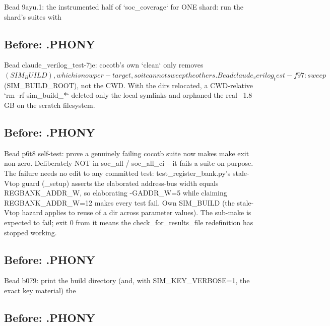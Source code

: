 \begin{record}
\begin{textblock}
Bead 9ayu.1: the instrumented half of `soc_coverage` for ONE shard: run the shard's suites with
\end{textblock}

\subsection*{Before: .PHONY}

\begin{textblock}
Bead claude_verilog_test-7je: cocotb's own `clean` only removes $(SIM_BUILD),
which is now per-target, so it cannot sweep the others.
Bead claude_verilog_test-f97: sweep $(SIM_BUILD_ROOT), not the CWD.  With the
dirs relocated, a CWD-relative `rm -rf sim_build_*` deleted only the local
symlinks and orphaned the real ~1.8 GB on the scratch filesystem.
\end{textblock}

\subsection*{Before: .PHONY}

\begin{textblock}
Bead p6t8 self-test: prove a genuinely failing cocotb suite now makes make exit non-zero.
Deliberately NOT in soc_all / soc_all_ci -- it fails a suite on purpose.  The failure needs
no edit to any committed test: test_register_bank.py's stale-Vtop guard (_setup) asserts
the elaborated address-bus width equals REGBANK_ADDR_W, so elaborating -GADDR_W=5 while
claiming REGBANK_ADDR_W=12 makes every test fail.  Own SIM_BUILD (the stale-Vtop hazard
applies to reuse of a dir across parameter values).  The sub-make is expected to fail;
exit 0 from it means the check_for_results_file redefinition has stopped working.
\end{textblock}

\subsection*{Before: .PHONY}

\begin{textblock}
Bead b079: print the build directory (and, with SIM_KEY_VERBOSE=1, the exact key material) the
\end{textblock}

\subsection*{Before: .PHONY}


\end{record}

